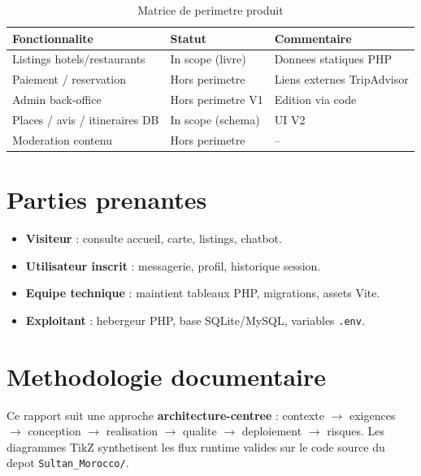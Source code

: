 \begin{table}[H]
\centering
\caption{Matrice de perimetre produit}
\begin{tabularx}{\textwidth}{@{}lXX@{}}
\toprule
\textbf{Fonctionnalite} & \textbf{Statut} & \textbf{Commentaire} \\
\midrule
Listings hotels/restaurants & In scope (livre) & Donnees statiques PHP \\
Paiement / reservation & Hors perimetre & Liens externes TripAdvisor \\
Admin back-office & Hors perimetre V1 & Edition via code \\
Places / avis / itineraires DB & In scope (schema) & UI V2 \\
Moderation contenu & Hors perimetre & -- \\
\bottomrule
\end{tabularx}
\end{table}

\section{Parties prenantes}

\begin{itemize}
  \item \textbf{Visiteur} : consulte accueil, carte, listings, chatbot.
  \item \textbf{Utilisateur inscrit} : messagerie, profil, historique session.
  \item \textbf{Equipe technique} : maintient tableaux PHP, migrations, assets Vite.
  \item \textbf{Exploitant} : hebergeur PHP, base SQLite/MySQL, variables \texttt{.env}.
\end{itemize}

\section{Methodologie documentaire}

Ce rapport suit une approche \textbf{architecture-centree} : contexte $\rightarrow$ exigences $\rightarrow$ conception $\rightarrow$ realisation $\rightarrow$ qualite $\rightarrow$ deploiement $\rightarrow$ risques. Les diagrammes TikZ synthetisent les flux runtime valides sur le code source du depot \texttt{Sultan\_Morocco/}.

\archDiagram
\mvcDiagram
